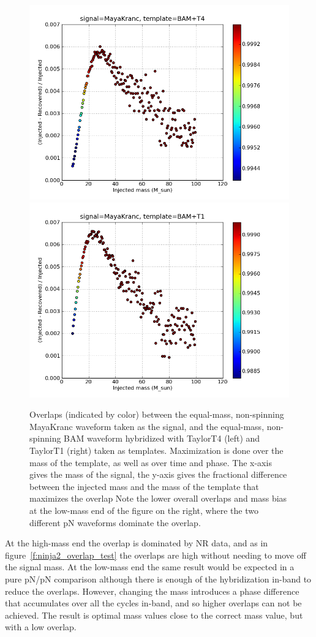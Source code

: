 \begin{figure}
  \includegraphics[width=0.5\linewidth]{figures/ninja2/maya_bamt4_max_over_m}
  \includegraphics[width=0.5\linewidth]{figures/ninja2/maya_bamt1_max_over_m}
  \caption[Overlaps between NINJA-2 submissions maximized over mass]{
  \label{f:ninja2_max_over_mass_bam}
Overlaps (indicated by color) between the equal-mass, non-spinning
MayaKranc waveform taken as the signal, and the equal-mass,
non-spinning BAM waveform hybridized with TaylorT4 (left) and TaylorT1
(right) taken as templates.  Maximization is done over the mass of the
template, as well as over time and phase.  The x-axis gives the mass
of the signal, the y-axis gives the fractional difference between the
injected mass and the mass of the template that maximizes the overlap
Note the lower overall overlaps and mass bias at the low-mass end of
the figure on the right, where the two different pN waveforms dominate
the overlap.}
\end{figure}%

At the high-mass end the overlap is dominated by NR data, and as in
figure~\ref{f:ninja2_overlap_test} the overlaps are high without
needing to move off the signal mass.  At the low-mass end the same
result would be expected in a pure pN/pN comparison although there
is enough of the hybridization in-band to reduce the overlaps.  However,
changing the mass introduces a phase difference that accumulates over
all the cycles in-band, and so higher overlaps can not be achieved.
The result is optimal mass values close to the correct mass value, but
with a low overlap.


